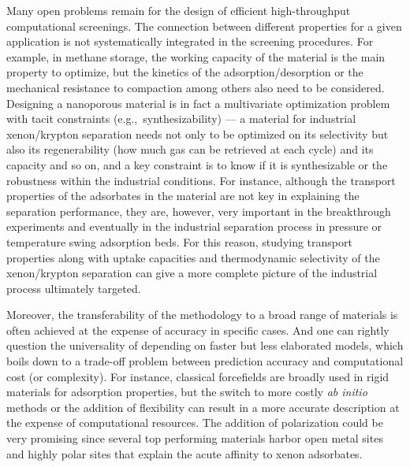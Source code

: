 \documentclass[main.tex]{subfiles}
\begin{document}
Many open problems remain for the design of efficient high-throughput computational screenings. The connection between different properties for a given application is not systematically integrated in the screening procedures. For example, in methane storage, the working capacity of the material is the main property to optimize, but the kinetics of the adsorption/desorption or the mechanical resistance to compaction among others also need to be considered. Designing a nanoporous material is in fact a multivariate optimization problem with tacit constraints (e.g.,\ synthesizability) --- a material for industrial xenon/krypton separation needs not only to be optimized on its selectivity but also its regenerability (how much gas can be retrieved at each cycle) and its capacity and so on, and a key constraint is to know if it is synthesizable or the robustness within the industrial conditions. For instance, although the transport properties of the adsorbates in the material are not key in explaining the separation performance, they are, however, very important in the breakthrough experiments and eventually in the industrial separation process in pressure or temperature swing adsorption beds. For this reason, studying transport properties along with uptake capacities and thermodynamic selectivity of the xenon/krypton separation can give a more complete picture of the industrial process ultimately targeted. 

Moreover, the transferability of the methodology to a broad range of materials is often achieved at the expense of accuracy in specific cases. And one can rightly question the universality of depending on faster but less elaborated models, which boils down to a trade-off problem between prediction accuracy and computational cost (or complexity). For instance, classical forcefields are broadly used in rigid materials for adsorption properties, but the switch to more costly \emph{ab initio} methods or the addition of flexibility can result in a more accurate description at the expense of computational resources. The addition of polarization could be very promising since several top performing materials harbor open metal sites and highly polar sites that explain the acute affinity to xenon adsorbates. 
\end{document}
